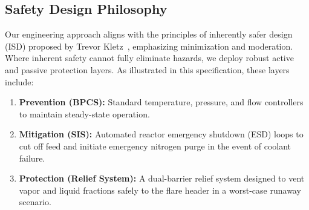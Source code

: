\subsection{Safety Design Philosophy}
Our engineering approach aligns with the principles of inherently safer design (ISD) proposed by Trevor Kletz~\cite{kletz2009}, emphasizing minimization and moderation. Where inherent safety cannot fully eliminate hazards, we deploy robust active and passive protection layers. As illustrated in this specification, these layers include:
\begin{enumerate}
    \item \textbf{Prevention (BPCS):} Standard temperature, pressure, and flow controllers to maintain steady-state operation.
    \item \textbf{Mitigation (SIS):} Automated reactor emergency shutdown (ESD) loops to cut off feed and initiate emergency nitrogen purge in the event of coolant failure.
    \item \textbf{Protection (Relief System):} A dual-barrier relief system designed to vent vapor and liquid fractions safely to the flare header in a worst-case runaway scenario.
\end{enumerate}

